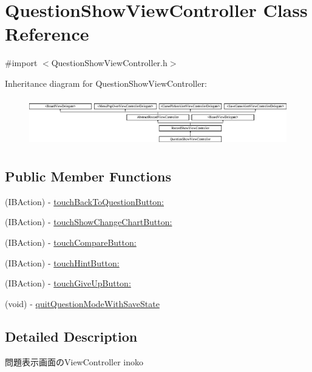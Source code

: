 \hypertarget{interface_question_show_view_controller}{
\section{QuestionShowViewController Class Reference}
\label{interface_question_show_view_controller}
}


{\ttfamily \#import $<$QuestionShowViewController.h$>$}

Inheritance diagram for QuestionShowViewController:\begin{figure}[H]
\begin{center}
\leavevmode
\includegraphics[height=2.129278cm]{interface_question_show_view_controller}
\end{center}
\end{figure}
\subsection*{Public Member Functions}
\begin{DoxyCompactItemize}
\item 
(IBAction) -\/ \hyperlink{interface_question_show_view_controller_a7d6b2501bcd359a8188616e82c381ec8}{touchBackToQuestionButton:}
\item 
(IBAction) -\/ \hyperlink{interface_question_show_view_controller_a0ec37f9f15052ef586da0426bc38c891}{touchShowChangeChartButton:}
\item 
(IBAction) -\/ \hyperlink{interface_question_show_view_controller_af85cd91bc53e301335ee9ab9ed7de115}{touchCompareButton:}
\item 
(IBAction) -\/ \hyperlink{interface_question_show_view_controller_aef4fec4b3cdc4db59d7656dd26a7b121}{touchHintButton:}
\item 
(IBAction) -\/ \hyperlink{interface_question_show_view_controller_af500c36f55f5f536feec911066789dc5}{touchGiveUpButton:}
\item 
(void) -\/ \hyperlink{interface_question_show_view_controller_a99c2bcda1ba83193ec17af858aa5fbe2}{quitQuestionModeWithSaveState}
\end{DoxyCompactItemize}


\subsection{Detailed Description}
問題表示画面のViewController  inoko 

